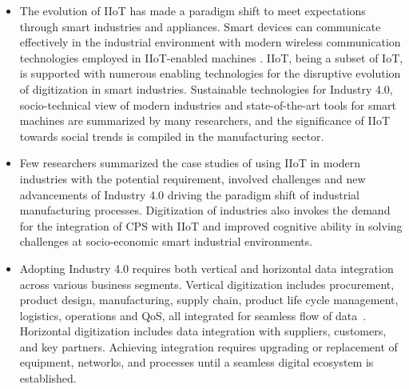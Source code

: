 \documentclass[journal]{IEEEtran}
\begin{document}
\begin{itemize}

    \item The evolution of IIoT has made a paradigm shift to meet expectations through smart industries and appliances. Smart devices can communicate effectively in the industrial environment with modern wireless communication technologies employed in IIoT-enabled machines \cite{khan2020industrial}. IIoT, being a subset of IoT, is supported with numerous enabling technologies for the disruptive evolution of digitization in smart industries\cite{younan_challenges_2020}. Sustainable technologies for Industry 4.0\cite{ghobakhloo_industry_2020}, socio-technical view of modern industries\cite{beier_industry_2020} and state-of-the-art tools for smart machines\cite{xu_industry_2018} are summarized by many researchers, and the significance of IIoT towards social trends is compiled in the manufacturing sector. 
    
    \item Few researchers summarized the case studies of using IIoT in modern industries\cite{lu_oil_2019} with the potential requirement, involved challenges \cite{silva_implementation_2020} and new advancements of Industry 4.0\cite{hervas-oliver_place-based_2019} driving the paradigm shift of industrial manufacturing processes. Digitization of industries also invokes the demand for the integration of CPS with IIoT\cite{kipper_scopus_2020} and improved cognitive ability in solving challenges at socio-economic smart industrial environments\cite{zolotova_smart_2020}.  

    \item Adopting Industry 4.0 requires both vertical and horizontal data integration across various business segments. Vertical digitization includes procurement, product design, manufacturing, supply chain,  product life cycle management, logistics, operations and QoS, all integrated for seamless flow of data~\cite{faheem2018mqrp}. Horizontal digitization includes data integration with suppliers, customers, and key partners. Achieving integration requires upgrading or replacement of equipment, networks, and processes until a seamless digital ecosystem is established.  

\end{itemize}
\end{document}
